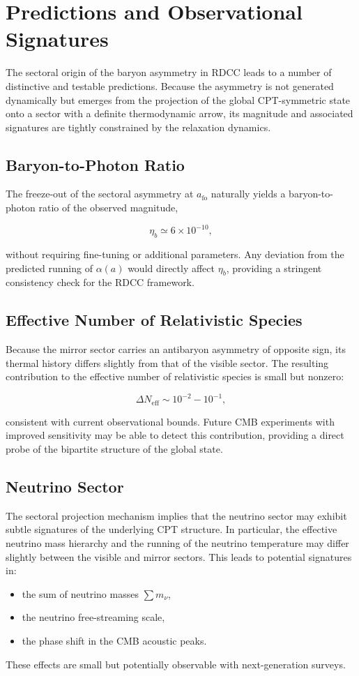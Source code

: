 \documentclass[11pt,a4paper]{article}
\newcommand{\alphaR}{\alpha}
\begin{document}
\section{Predictions and Observational Signatures}

The sectoral origin of the baryon asymmetry in RDCC leads to a number of
distinctive and testable predictions. Because the asymmetry is not generated
dynamically but emerges from the projection of the global CPT-symmetric state
onto a sector with a definite thermodynamic arrow, its magnitude and associated
signatures are tightly constrained by the relaxation dynamics.

\subsection{Baryon-to-Photon Ratio}

The freeze-out of the sectoral asymmetry at $a_{\mathrm{fo}}$ naturally yields a
baryon-to-photon ratio of the observed magnitude,


\[
\eta_b \simeq 6 \times 10^{-10},
\]


without requiring fine-tuning or additional parameters. Any deviation from the
predicted running of $\alphaR(a)$ would directly affect $\eta_b$, providing a
stringent consistency check for the RDCC framework.

\subsection{Effective Number of Relativistic Species}

Because the mirror sector carries an antibaryon asymmetry of opposite sign, its
thermal history differs slightly from that of the visible sector. The resulting
contribution to the effective number of relativistic species is small but
nonzero:


\[
\Delta N_{\mathrm{eff}} \sim 10^{-2} - 10^{-1},
\]


consistent with current observational bounds. Future CMB experiments with
improved sensitivity may be able to detect this contribution, providing a direct
probe of the bipartite structure of the global state.

\subsection{Neutrino Sector}

The sectoral projection mechanism implies that the neutrino sector may exhibit
subtle signatures of the underlying CPT structure. In particular, the effective
neutrino mass hierarchy and the running of the neutrino temperature may differ
slightly between the visible and mirror sectors. This leads to potential
signatures in:
\begin{itemize}
    \item the sum of neutrino masses $\sum m_\nu$,
    \item the neutrino free-streaming scale,
    \item the phase shift in the CMB acoustic peaks.
\end{itemize}
These effects are small but potentially observable with next-generation surveys.
\end{document}
